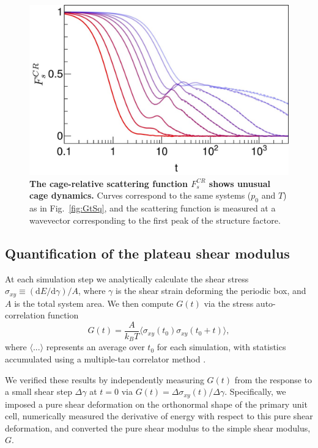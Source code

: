 \documentclass[aps,reprint,superscriptaddress,nofootinbib, notitlepage,prl]{revtex4-2}
\begin{document}
\begin{figure}[t]
	\centering
    \includegraphics[width=.9\linewidth]{endMatter_CageRelativeFs}
	\caption{\textbf{The cage-relative scattering function $F^{CR}_s$ shows unusual cage dynamics.}
        Curves correspond to the same systems ($p_0$ and $T$) as in Fig.~\ref{fig:GtSq}, and the scattering function is measured at a wavevector corresponding to the first peak of the structure factore.
	}
	\label{fig:cageRelativeFs}
\end{figure}

\subsection{Quantification of the plateau shear modulus}

At each simulation step we analytically calculate the shear stress $\sigma_{xy}\equiv (\mathrm{d}E/\mathrm{d}\gamma)/A$, where $\gamma$ is the shear strain deforming the periodic box, and $A$ is the total system area.
We then compute $G(t)$ via the stress auto-correlation function 
\begin{equation}\label{eq:G(t)}
	G(t)=\frac{A}{k_BT}\Big\langle\sigma_{xy}(t_0)\sigma_{xy}(t_0+t)\Big\rangle,
\end{equation}
where $\langle...\rangle$ represents an average over $t_0$ for each simulation, with statistics accumulated using a multiple-tau correlator method \cite{ramirez2010efficient}.

We verified these results by independently measuring $G(t)$ from the response to a small shear step $\Delta \gamma$ at $t=0$ via $G(t)=\Delta \sigma_{xy}(t)/\Delta\gamma$. Specifically, we imposed a pure shear deformation on the orthonormal shape of the primary unit cell, numerically measured the derivative of energy with respect to this pure shear deformation, and converted the pure shear modulus to the simple shear modulus, $G$.
\end{document}
